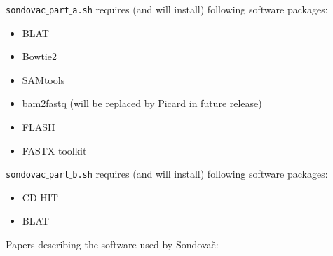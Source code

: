 \documentclass[a4paper, 11pt, twoside]{article}
\begin{document}
\texttt{sondovac$\_$part$\_$a.sh} requires (and will install) following software packages:

\begin{itemize}
  \item BLAT
  \item Bowtie2
  \item SAMtools
  \item bam2fastq (will be replaced by Picard in future release)
  \item FLASH
  \item FASTX-toolkit
\end{itemize}

\texttt{sondovac$\_$part$\_$b.sh} requires (and will install) following software packages:

\begin{itemize}
  \item CD-HIT
  \item BLAT
\end{itemize}

Papers describing the software used by Sondovač:
\end{document}
